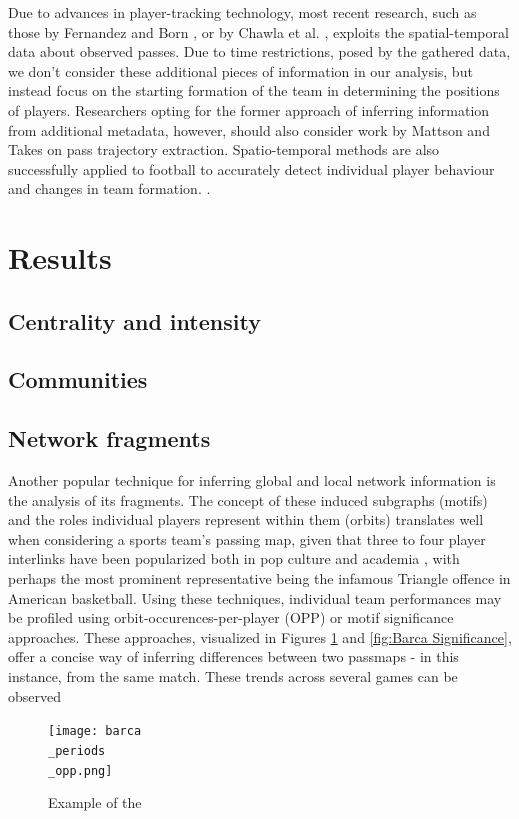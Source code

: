 \documentclass[9pt,twocolumn,twoside]{pnas-report}
\begin{document}
Due to advances in player-tracking technology, most recent research, such as those by Fernandez and Born \cite{fbrn}, or by Chawla et al. \cite{chawla}, exploits the spatial-temporal data about observed passes. Due to time restrictions, posed by the gathered data, we don't consider these additional pieces of information in our analysis, but instead focus on the starting formation of the team in determining the positions of players. Researchers opting for the former approach of inferring information from additional metadata, however, should also consider work by Mattson and Takes \cite{trajectory} on pass trajectory extraction. Spatio-temporal methods are also successfully applied to football to accurately detect individual player behaviour and changes in team formation. \cite{bialkowski2014large}.

\section*{Results}

\subsection*{Centrality and intensity}
\subsection*{Communities}
\subsection*{Network fragments}
Another popular technique for inferring global and local network information is the analysis of its fragments. The concept of these induced subgraphs (motifs) and the roles individual players represent within them (orbits) translates well when considering a sports team's passing map, given that three to four player interlinks have been popularized both in pop culture and academia \cite{triangle}, with perhaps the most prominent representative being the infamous Triangle offence in American basketball. Using these techniques, individual team performances may be profiled using orbit-occurences-per-player (OPP) or motif significance approaches. These approaches, visualized in Figures \ref{fig:BarcaOPP} and \ref{fig:Barca Significance}, offer a concise way of inferring differences between two passmaps - in this instance, from the same match. These trends across several games can be observed

\begin{figure}[t]\centering
	\texttt{[image: barca\\\_periods\\\_opp.png]}
	\caption{Example of the }
	\label{fig:BarcaOPP}
\end{figure}
\end{document}
